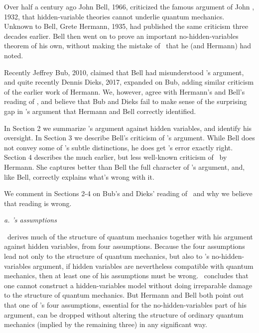 \bigskip  


\medskip

Over half a century ago John Bell, 1966,  criticized %
the famous argument of John \vN, 1932,  that hidden-variable theories cannot underlie quantum mechanics.    Unknown to Bell, Grete Hermann, 1935,  had published the same criticism three decades earlier.  Bell then went on to prove an important  no-hidden-variables theorem of his own,  without %
making the mistake of \vN\ that he (and Hermann) 
had noted.

Recently Jeffrey Bub, 2010,  claimed that Bell had misunderstood \vN's argument, and quite recently Dennis Dieks, 2017,  expanded on Bub, adding similar criticism of the earlier work of Hermann.  
We, however, agree with Hermann's and Bell's reading of  \vN, and believe that   
Bub and Dieks  fail to make sense of  the surprising gap in
 \vN's argument that Hermann and Bell correctly identified.  

In Section 2 we summarize  \vN's argument against hidden variables, and identify his oversight.       In Section 3 we describe Bell's criticism of \vN's argument. While  Bell does not convey some of \vN's subtle distinctions,  he does get \vN's error exactly right.    Section 4 describes the much earlier, but less well-known criticism of \vN\ by Hermann.  She captures better than Bell  the full character of \vN's argument, and, like Bell, correctly explains what's wrong with it. 

We comment in Sections 2-4 on Bub's and Dieks' reading of \vN\ and why we believe that reading is wrong.

\bigskip
{}
\medskip
\centerline{\sl a.  \VN's assumptions}
\medskip
\VN\ derives much of the structure of quantum mechanics together with his argument against hidden variables, from four assumptions.    Because the four assumptions lead not only to the structure of quantum mechanics, but also to \vN's no-hidden-variables argument,  if hidden variables are nevertheless compatible with quantum mechanics, then at least one of his assumptions must be wrong.  \VN\  concludes that one cannot construct a hidden-variables model without doing irreparable damage to the structure of quantum mechanics.  But Hermann and Bell both point out that one of \vN's four assumptions, essential for the no-hidden-variables part of his argument, can be dropped without altering the structure of ordinary quantum mechanics (implied by the remaining three) in any significant way.  

